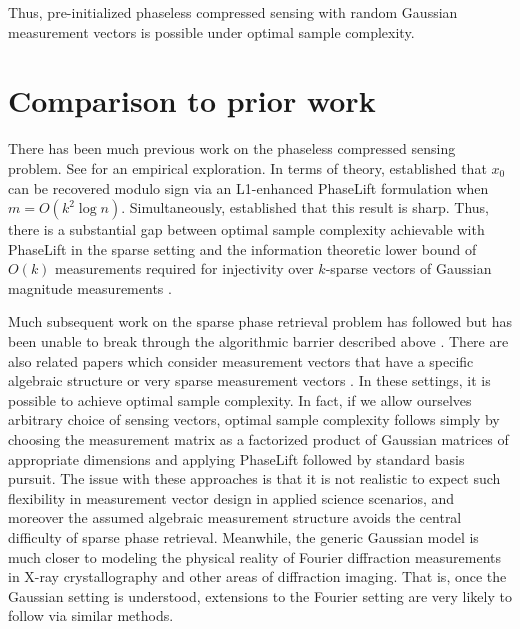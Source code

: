 \documentclass[12pt]{article}
\newcommand{\1}{\mathbf{1}}
\begin{document}
Thus, pre-initialized phaseless compressed sensing with random Gaussian measurement vectors is possible under optimal sample complexity.

\section{Comparison to prior work}

There has been much previous work on the phaseless compressed sensing problem.  See \cite{cpremprical} for an empirical exploration.  In terms of theory, \cite{li2013sparse} established that $x_0$ can be recovered modulo sign via an L1-enhanced PhaseLift formulation when $m = O(k^2 \log n)$. Simultaneously, \cite{li2013sparse} established that this result is sharp. Thus, there is a substantial gap between optimal sample complexity achievable with PhaseLift in the sparse setting and the information theoretic lower bound of $O(k)$ measurements required for injectivity over $k$-sparse vectors of Gaussian magnitude measurements \cite{voroninski2016strong}.

Much subsequent work on the sparse phase retrieval problem has followed but has been unable to break through the algorithmic barrier described above \cite{oymak2015simultaneously, GAMP, Yon}. There are also related papers which consider measurement vectors that have a specific algebraic structure \cite{DustinSparse, iwen2015robust, jaganathan2013sparse} or very sparse measurement vectors \cite{Babak}. In these settings, it is possible to achieve optimal sample complexity. In fact, if we allow ourselves arbitrary choice of sensing vectors, optimal sample complexity follows simply by choosing the measurement matrix as a factorized product of Gaussian matrices of appropriate dimensions and applying PhaseLift followed by standard basis pursuit. The issue with these approaches is that it is not realistic to expect such flexibility in measurement vector design in applied science scenarios, and moreover the assumed algebraic measurement structure avoids the central difficulty of sparse phase retrieval.  Meanwhile, the generic Gaussian model is much closer to modeling the physical reality of Fourier diffraction measurements in X-ray crystallography and other areas of diffraction imaging. That is, once the Gaussian setting is understood, extensions to the Fourier setting are very likely to follow via similar methods. %
\end{document}
